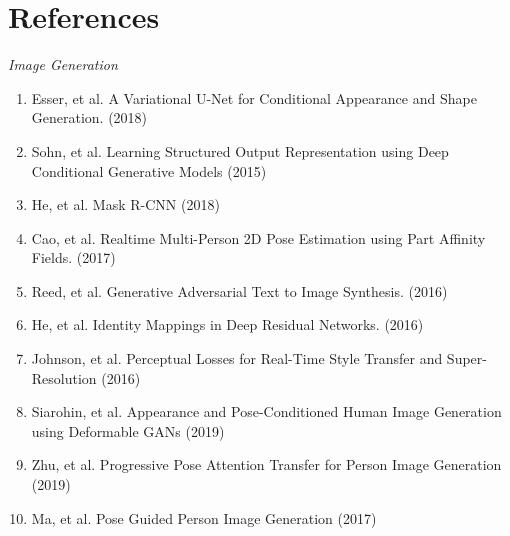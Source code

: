 \documentclass{article}
\begin{document}
\section{References}
\textit{Image Generation}
\begin{enumerate}
\item Esser, et al. A Variational U-Net for Conditional Appearance and Shape Generation. (2018)
\item Sohn, et al. Learning Structured Output Representation using Deep Conditional Generative Models (2015)
\item He, et al. Mask R-CNN (2018)
\item Cao, et al. Realtime Multi-Person 2D Pose Estimation using Part Affinity Fields. (2017)
\item Reed, et al. Generative Adversarial Text to Image Synthesis. (2016) 
\item He, et al. Identity Mappings in Deep Residual Networks. (2016)
\item Johnson, et al. Perceptual Losses for Real-Time Style Transfer and Super-Resolution (2016)
\item Siarohin, et al. Appearance and Pose-Conditioned Human Image Generation using Deformable GANs (2019)
\item Zhu, et al. Progressive Pose Attention Transfer for Person Image Generation (2019)
\item Ma, et al. Pose Guided Person Image Generation (2017)
\end{enumerate}
\end{document}
